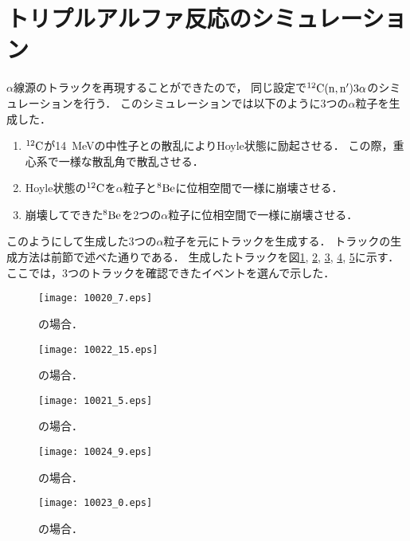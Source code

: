 \documentclass[../master]{subfiles}
\begin{document}
\section{トリプルアルファ反応のシミュレーション}
\label{sec::triple_alpha_simulation}
$\alpha$線源のトラックを再現することができたので，
同じ設定で${}^{12}{\rm C}({\rm n},{\rm n}')3\alpha$のシミュレーションを行う．
このシミュレーションでは以下のように3つの$\alpha$粒子を生成した．
\begin{enumerate}
\item
  ${}^{12}{\rm C}$が\SI{14}{\mega\electronvolt}の中性子との散乱によりHoyle状態に励起させる．
  この際，重心系で一様な散乱角で散乱させる．
\item
  Hoyle状態の${}^{12}{\rm C}$を$\alpha$粒子と${}^{8}{\rm Be}$に位相空間で一様に崩壊させる．
\item
  崩壊してできた${}^{8}{\rm Be}$を2つの$\alpha$粒子に位相空間で一様に崩壊させる．
\end{enumerate}
このようにして生成した3つの$\alpha$粒子を元にトラックを生成する．
トラックの生成方法は前節で述べた通りである．
生成したトラックを図\ref{fig::three_alpha_ch4}, \ref{fig::three_alpha_ch4_h2}, \ref{fig::three_alpha_ch4_he},
\ref{fig::three_alpha_ic4h10_h2}, \ref{fig::three_alpha_ic4h10_he}に示す．
ここでは，3つのトラックを確認できたイベントを選んで示した．

\begin{figure}[h]
  \centering
  \texttt{[image: 10020\_7.eps]}
  \caption{\Methane の場合．}
  \label{fig::three_alpha_ch4}
\end{figure}
\begin{figure}
  \centering
  \texttt{[image: 10022\_15.eps]}
  \caption{\MethaneHydro の場合．}
  \label{fig::three_alpha_ch4_h2}
\end{figure}
\begin{figure}
  \centering
  \texttt{[image: 10021\_5.eps]}
  \caption{\MethaneHerium の場合．}
  \label{fig::three_alpha_ch4_he}
\end{figure}
\begin{figure}
  \centering
  \texttt{[image: 10024\_9.eps]}
  \caption{\isoButaneHydro の場合．}
  \label{fig::three_alpha_ic4h10_h2}
\end{figure}
\begin{figure}
  \centering
  \texttt{[image: 10023\_0.eps]}
  \caption{\isoButaneHerium の場合．}
  \label{fig::three_alpha_ic4h10_he}
\end{figure}
\end{document}

